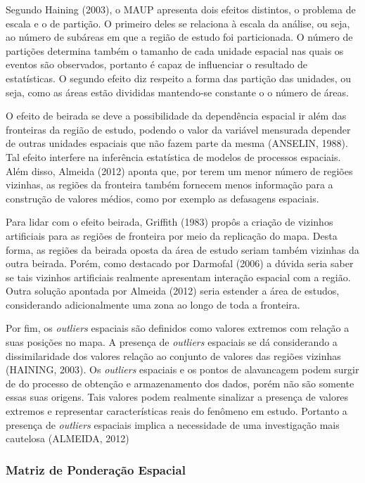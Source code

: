 \documentclass[12pt, a4paper,brazil,oneside]{article}
\begin{document}
	Segundo Haining (2003), o MAUP apresenta dois efeitos distintos, o problema de escala e o de partição. O primeiro deles se relaciona à escala da análise, ou seja, ao número de subáreas em que a região de estudo foi particionada. O número de partições determina também o tamanho de cada unidade espacial nas quais os eventos são observados, portanto é capaz de influenciar o resultado de estatísticas. O segundo efeito diz respeito a forma das partição das unidades, ou seja, como as  áreas estão divididas mantendo-se constante o  o número de áreas.
	
	O efeito de beirada se deve a possibilidade da dependência espacial ir além das fronteiras da região de estudo, podendo o valor da variável mensurada depender de outras unidades espaciais que não fazem parte da mesma (ANSELIN, 1988). Tal efeito interfere na  inferência estatística de modelos de processos espaciais. Além disso, Almeida (2012) aponta que, por terem um menor número de regiões vizinhas, as regiões da fronteira também fornecem menos informação para a construção de valores médios, como por exemplo as defasagens espaciais.
	
	Para lidar com o efeito beirada, Griffith (1983) propôs a criação de vizinhos artificiais para as regiões de fronteira por meio da replicação do mapa. Desta forma, as regiões da beirada oposta da área de estudo seriam também vizinhas da outra beirada. Porém, como destacado por Darmofal (2006) a dúvida seria saber se tais vizinhos artificiais realmente apresentam interação espacial com a região. Outra solução apontada por Almeida (2012) seria estender a área de estudos, considerando adicionalmente uma zona ao longo de toda a fronteira.
	
	Por fim, os \textit{outliers} espaciais são definidos como valores extremos com relação a suas posições no mapa. A presença de \textit{outliers} espaciais se dá considerando a dissimilaridade dos valores relação ao conjunto de valores das regiões vizinhas (HAINING, 2003). Os \textit{outliers} espaciais e os pontos de alavancagem podem surgir de do processo de obtenção e armazenamento dos dados, porém não são somente essas suas origens. Tais valores podem realmente sinalizar a presença de valores extremos e representar características reais do fenômeno em estudo. Portanto a presença de \textit{outliers} espaciais implica a necessidade de uma investigação mais cautelosa (ALMEIDA, 2012)
	
	\subsubsection{Matriz de Ponderação Espacial}
	
\end{document}
